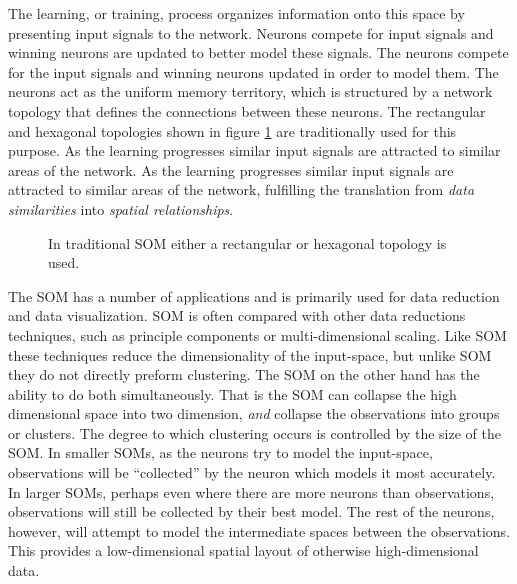 The learning, or training, process organizes information onto this space by presenting input signals to the network.
Neurons compete for input signals and winning neurons are updated to better model these signals.
The neurons compete for the input signals and winning neurons updated in order to model them.
The neurons act as the uniform memory territory, which is structured by a network topology that defines the connections between these neurons.
The rectangular and hexagonal topologies shown in figure \ref{topos} are traditionally used for this purpose.
As the learning progresses similar input signals are attracted to similar areas of the network.
As the learning progresses similar input signals are attracted to similar areas of the network, fulfilling the translation from \emph{data similarities} into \emph{spatial relationships}.

\begin{figure}
\centering
{}
\caption{In traditional SOM either a rectangular or hexagonal topology is used.}
\label{topos}
\end{figure}

The SOM has a number of applications and is primarily used for data reduction
and data visualization.  SOM is often compared with other data reductions
techniques, such as principle components or multi-dimensional scaling. Like
SOM these techniques reduce the dimensionality of the input-space, but unlike
SOM they do not directly preform clustering.  The SOM on the other hand has
the ability to do both simultaneously.  That is the SOM can collapse the high
dimensional space into two dimension, \emph{and} collapse the observations
into groups or clusters.  The degree to which clustering occurs is controlled
by the size of the SOM.  In smaller SOMs, as the neurons try to model the
input-space, observations will be ``collected'' by the neuron which models it
most accurately.  In larger SOMs, perhaps even where there are more neurons
than observations, observations will still be collected by their best model.
The rest of the neurons, however, will attempt to model the intermediate
spaces between the observations.  This provides a low-dimensional spatial
layout of otherwise high-dimensional data.

